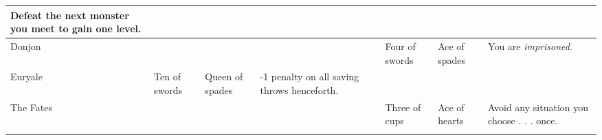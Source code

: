 \begin{longtable}{llllllll}
{\begin{minipage}[t]{1.000in}
Defeat the next monster you meet to gain one level.\end{minipage}}\\
\hline
\multicolumn{5}{p{2.168in}|}{\begin{minipage}[t]{2.168in}\raggedright
Donjon\end{minipage}} & \multicolumn{1}{p{0.043in}|}{\begin{minipage}[t]{0.043in}\raggedright
Four of swords\end{minipage}} & \multicolumn{1}{p{0.043in}|}{\begin{minipage}[t]{0.043in}\raggedright
Ace of spades\end{minipage}} & \multicolumn{1}{p{0.043in}|}{\begin{minipage}[t]{0.043in}\raggedright
You are \textit{imprisoned}.\end{minipage}}\\
\hline
\multicolumn{1}{p{0.043in}|}{\begin{minipage}[t]{0.043in}\raggedright
Euryale\end{minipage}} & \multicolumn{1}{|p{0.460in}|}{\begin{minipage}[t]{0.460in}\raggedright
Ten of swords\end{minipage}} & \multicolumn{1}{p{0.872in}|}{\begin{minipage}[t]{0.872in}\raggedright
Queen of spades\end{minipage}} & \multicolumn{1}{p{1.000in}|}{\begin{minipage}[t]{1.000in}\raggedright
-1 penalty on all saving throws henceforth.\end{minipage}}\\
\hline
\multicolumn{5}{p{2.168in}|}{\begin{minipage}[t]{2.168in}\raggedright
The Fates\end{minipage}} & \multicolumn{1}{|p{0.460in}|}{\begin{minipage}[t]{0.460in}\raggedright
Three of cups\end{minipage}} & \multicolumn{1}{p{0.872in}|}{\begin{minipage}[t]{0.872in}\raggedright
Ace of hearts\end{minipage}} & \multicolumn{1}{p{1.000in}|}{\begin{minipage}[t]{1.000in}\raggedright
Avoid any situation you choose . . . once.\end{minipage}}\\
\hline
\multicolumn{5}{p{2.168in}|}{\begin{minipage}[t]{2.168in}\raggedright

\end{minipage}}
\end{longtable}
